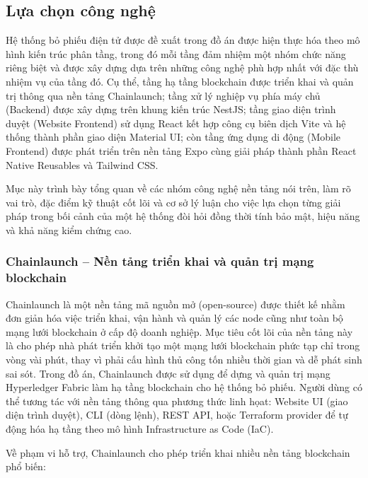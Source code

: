 \subsection{Lựa chọn công nghệ}

Hệ thống bỏ phiếu điện tử được đề xuất trong đồ án được hiện thực hóa theo mô hình kiến trúc phân tầng, trong đó mỗi tầng đảm nhiệm một nhóm chức năng riêng biệt và được xây dựng dựa trên những công nghệ phù hợp nhất với đặc thù nhiệm vụ của tầng đó. Cụ thể, tầng hạ tầng blockchain được triển khai và quản trị thông qua nền tảng Chainlaunch; tầng xử lý nghiệp vụ phía máy chủ (Backend) được xây dựng trên khung kiến trúc NestJS; tầng giao diện trình duyệt (Website Frontend) sử dụng React kết hợp công cụ biên dịch Vite và hệ thống thành phần giao diện Material UI; còn tầng ứng dụng di động (Mobile Frontend) được phát triển trên nền tảng Expo cùng giải pháp thành phần React Native Reusables và Tailwind CSS.

Mục này trình bày tổng quan về các nhóm công nghệ nền tảng nói trên, làm rõ vai trò, đặc điểm kỹ thuật cốt lõi và cơ sở lý luận cho việc lựa chọn từng giải pháp trong bối cảnh của một hệ thống đòi hỏi đồng thời tính bảo mật, hiệu năng và khả năng kiểm chứng cao.

\subsubsection{Chainlaunch -- Nền tảng triển khai và quản trị mạng blockchain}

Chainlaunch là một nền tảng mã nguồn mở (open-source) được thiết kế nhằm đơn giản hóa việc triển khai, vận hành và quản lý các node cũng như toàn bộ mạng lưới blockchain ở cấp độ doanh nghiệp. Mục tiêu cốt lõi của nền tảng này là cho phép nhà phát triển khởi tạo một mạng lưới blockchain phức tạp chỉ trong vòng vài phút, thay vì phải cấu hình thủ công tốn nhiều thời gian và dễ phát sinh sai sót. Trong đồ án, Chainlaunch được sử dụng để dựng và quản trị mạng Hyperledger Fabric làm hạ tầng blockchain cho hệ thống bỏ phiếu. Người dùng có thể tương tác với nền tảng thông qua phương thức linh họat: Website UI (giao diện trình duyệt), CLI (dòng lệnh), REST API, hoặc Terraform provider để tự động hóa hạ tầng theo mô hình Infrastructure as Code (IaC).

Về phạm vi hỗ trợ, Chainlaunch cho phép triển khai nhiều nền tảng blockchain phổ biến:

